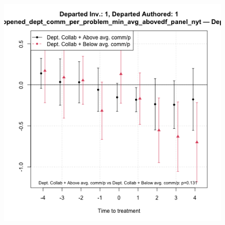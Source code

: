 \begin{figure}[htbp]
\begin{minipage}[b]{0.24\textwidth}
    \label{fig:prs_opened_comm_collab_nonint}
    \end{minipage}
    \hfill
    \begin{minipage}[b]{0.24\textwidth}
        \centering
        \includegraphics[width=\textwidth]{temp/output/collab_imp/auth_n1_inv_n1_cs_norm_prs_opened_dept_comm_per_problem_min_avg_above_Dept.Collab.png}
    \label{fig:prs_opened_comm_collab_per_nonint}
    \end{minipage}
    \hfill
        \begin{minipage}[b]{0.24\textwidth}
        \centering

\end{minipage}
\end{figure}
